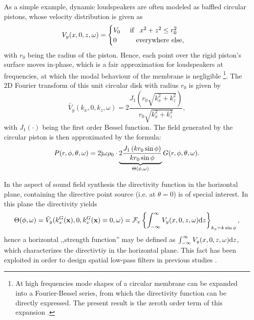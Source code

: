 \vspace{3mm}
As a simple example, dynamic loudspeakers are often modeled as baffled circular pistons, whose velocity distribution is given as
\begin{equation}
V_y(x,0,z,\omega) =
\begin{cases}
V_0  \hspace{5mm} \text{if} \hspace{3mm} x^2+z^2 \leq r_0^2\\ 
0 \hspace{10mm} \text{everywhere else},
\end{cases}
\end{equation} 
with $r_0$ being the radius of the piston.
Hence, each point over the rigid piston's surface moves in-phase, which is a fair approximation for loudspeakers at frequencies, at which the modal behaviour of the membrane is negligible \footnote{At high frequencies mode shapes of a circular membrane can be expanded into a Fourier-Bessel series, from which the directivity function can be directly expressed. 
The present result is the zeroth order term of this expansion \cite{Williams1999}.}.
The 2D Fourier transform of this unit circular disk with radius $r_0$ is given by
\begin{equation}
\tilde{V_y}(k_x,0,k_z,\omega) = 2 \frac{J_1\left( r_0 \sqrt{k_x^2+k_z^2} \right)}{r_0 \sqrt{k_x^2+k_z^2}},
\end{equation}
with $J_1(\cdot)$ being the first order Bessel function. 
The field generated by the circular piston is then approximated by the formula:
\begin{equation}
P(r,\phi,\theta,\omega) = 
2 \mathrm{j} \omega \rho_0 \cdot \underbrace{2
\frac{J_1\left( k r_0 \sin \phi \right)}{k r_0 \sin \phi}
}_{\Theta(\phi,\omega)}
G(r,\phi,\theta,\omega).
\label{Eq:App_Circ_piston}
\end{equation}

In the aspect of sound field synthesis the directivity function in the horizontal plane, containing the directive point source (i.e. at $\theta=0$) is of special interest.
In this plane the directivity yields
\begin{equation}
\Theta(\phi,\omega) = \tilde{V}_{y}(k_x^G(\mathbf{x}),0,k_z^G(\mathbf{x}) \equiv 0 ,\omega) = \mathcal{F}_x\left\{ \int_{-\infty}^{\infty} V_y(x,0,z,\omega) \mathrm{d} z \right\}_{k_x = k \sin \phi},
\end{equation}
hence a horizontal ,,strength function'' may be defined as $\int_{-\infty}^{\infty} V_y(x,0,z,\omega) \mathrm{d} z$, which characterizes the directivtiy in the horizontal plane.
This fact has been exploited in order to design spatial low-pass filters in previous studies \cite{Verheijen1997}.